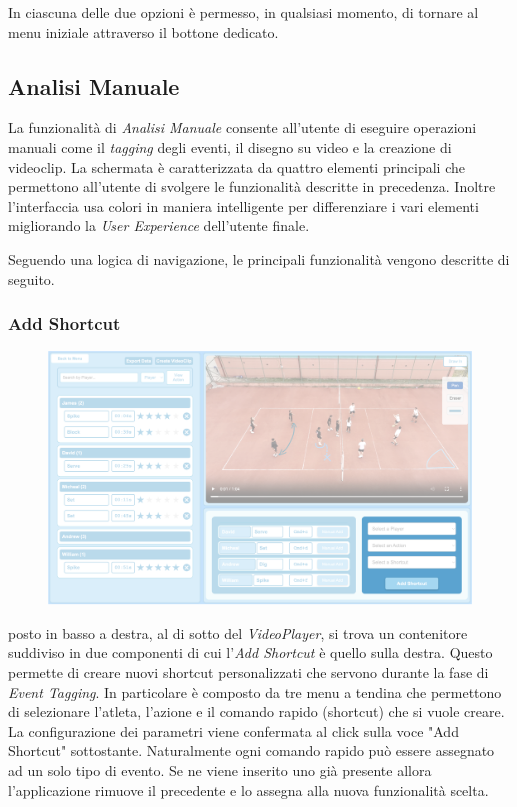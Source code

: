 \noindent In ciascuna delle due opzioni è permesso, in qualsiasi momento, di tornare al menu iniziale attraverso il bottone dedicato.



\subsection{Analisi Manuale}
\label{subsec:funzionalita_manual}

La funzionalità di \textit{Analisi Manuale} consente all'utente di eseguire operazioni manuali come il \textit{tagging} degli eventi, il disegno su video e la creazione di videoclip. La schermata è caratterizzata da quattro elementi principali che permettono all'utente di svolgere le funzionalità descritte in precedenza. Inoltre l'interfaccia usa colori in maniera intelligente per differenziare i vari elementi migliorando la \textit{User Experience} dell'utente finale.

Seguendo una logica di navigazione, le principali funzionalità vengono descritte di seguito.



\newpage

\subsubsection{Add Shortcut}
\begin{figure}
    \centering
    \includegraphics[width=\linewidth]{img/add_listener.png}
    \label{fig:add_listener}
\end{figure}

posto in basso a destra, al di sotto del \textit{VideoPlayer}, si trova un contenitore suddiviso in due componenti di cui l'\textit{Add Shortcut} è quello sulla destra. Questo permette di creare nuovi shortcut personalizzati che servono durante la fase di \textit{Event Tagging}. In particolare è composto da tre menu a tendina che permettono di selezionare l'atleta, l'azione e il comando rapido (shortcut) che si vuole creare. La configurazione dei parametri viene confermata al click sulla voce  "Add Shortcut" sottostante. Naturalmente ogni comando rapido può essere assegnato ad un solo tipo di evento. Se ne viene inserito uno già presente allora l'applicazione rimuove il precedente e lo assegna alla nuova funzionalità scelta.

